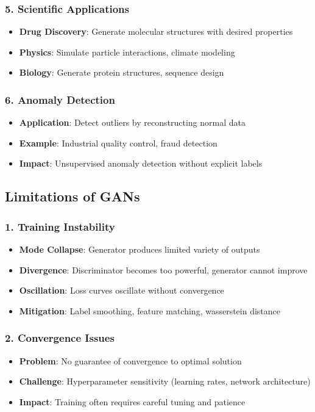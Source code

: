 \documentclass[12pt,a4paper]{article}
\begin{document}
\subsubsection{5. Scientific Applications}
\begin{itemize}
    \item \textbf{Drug Discovery}: Generate molecular structures with desired properties
    \item \textbf{Physics}: Simulate particle interactions, climate modeling
    \item \textbf{Biology}: Generate protein structures, sequence design
\end{itemize}

\subsubsection{6. Anomaly Detection}
\begin{itemize}
    \item \textbf{Application}: Detect outliers by reconstructing normal data
    \item \textbf{Example}: Industrial quality control, fraud detection
    \item \textbf{Impact}: Unsupervised anomaly detection without explicit labels
\end{itemize}

\subsection{Limitations of GANs}

\subsubsection{1. Training Instability}
\begin{itemize}
    \item \textbf{Mode Collapse}: Generator produces limited variety of outputs
    \item \textbf{Divergence}: Discriminator becomes too powerful, generator cannot improve
    \item \textbf{Oscillation}: Loss curves oscillate without convergence
    \item \textbf{Mitigation}: Label smoothing, feature matching, wasserstein distance
\end{itemize}

\subsubsection{2. Convergence Issues}
\begin{itemize}
    \item \textbf{Problem}: No guarantee of convergence to optimal solution
    \item \textbf{Challenge}: Hyperparameter sensitivity (learning rates, network architecture)
    \item \textbf{Impact}: Training often requires careful tuning and patience
\end{itemize}
\end{document}
